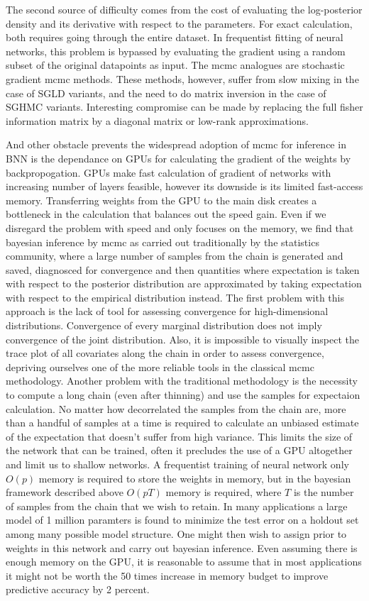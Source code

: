 \documentclass{book}
\begin{document}
\begin{enumerate}
The second source of difficulty comes from the cost of evaluating the
log-posterior density and its derivative with respect to the parameters. For
exact calculation, both requires going through the entire dataset. In
frequentist fitting of neural networks, this problem is bypassed by evaluating
the gradient using a random subset of the original datapoints as input. The mcmc
analogues are stochastic gradient mcmc methods. These methods, however, suffer
from slow mixing in the case of SGLD variants, and the need to do matrix
inversion in the case of SGHMC variants. Interesting compromise can be made by
replacing the full fisher information matrix by a diagonal matrix or low-rank
approximations. 

And other obstacle prevents the widespread adoption of mcmc for inference in BNN
is the dependance on GPUs for calculating the gradient of the weights by
backpropogation. GPUs make fast calculation of gradient of networks with
increasing number of layers feasible, however its downside is its limited
fast-access memory. Transferring weights from the GPU to the main disk creates a
bottleneck in the calculation that balances out the speed gain. Even if we
disregard the problem with speed and only focuses on the memory, we find that
bayesian inference by mcmc as carried out traditionally by the statistics
community, where a large number of samples from the chain is generated and
saved, diagnosced for convergence and then quantities where expectation is taken
with respect to the posterior distribution are approximated by taking
expectation with respect to the empirical distribution instead. The first
problem with this approach is the lack of tool for assessing convergence for
high-dimensional distributions. Convergence of every marginal distribution does
not imply convergence of the joint distribution. Also, it is impossible to
visually inspect
the trace plot of all covariates along the chain in order to assess convergence,
depriving ourselves one of the more reliable tools in the classical mcmc
methodology. Another problem with the traditional methodology is the necessity
to compute a long chain (even after thinning) and use the samples for expectaion
calculation. No matter how decorrelated the samples from the chain are,
more than a handful of samples at a time is required to calculate an unbiased
estimate of the expectation that doesn't suffer from high variance. This limits
the size of the network that can be trained, often it precludes the use of a GPU
altogether and limit us to shallow networks. A frequentist training of neural
network only $O(p)$ memory is required to store the weights in memory, but in
the bayesian framework described above $O(pT)$ memory is required, where $T$ is
the number of samples from the chain that we wish to retain. In many
applications a large
model of 1 million paramters is found to minimize the test error on a holdout
set among many possible model structure. One might then wish to assign prior to
weights in this network and carry out bayesian inference. Even assuming there is
enough memory on the GPU, it is reasonable to assume that in most applications it might not be worth the 50 times increase in memory
budget to improve predictive accuracy by 2 percent. 


\end{enumerate}
\end{document}
